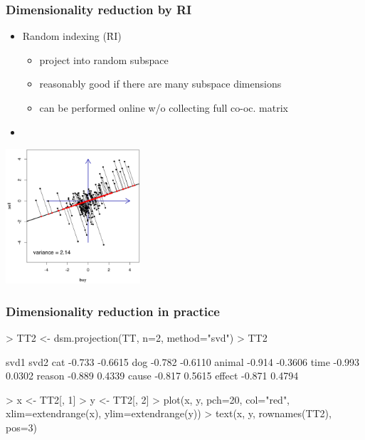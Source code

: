 \documentclass[t]{beamer} %
\begin{document}
\begin{frame}
  \frametitle{Dimensionality reduction by RI}

  \begin{itemize}
  \item Random indexing (\h{RI})
    \begin{itemize}
    \item project into random subspace \citep{Sahlgren:Karlgren:05}
    \item reasonably good if there are many subspace dimensions
    \item can be performed online w/o collecting full co-oc. matrix
    \end{itemize}
    \item[]
  \end{itemize}

  \begin{center}
    \includegraphics[width=5cm]{img/buy_sell_3_projection}
  \end{center}
\end{frame}

\begin{frame}[fragile]
  \frametitle{Dimensionality reduction in practice}

\ungap[1.5]
\begin{Rcode}
> TT2 <- dsm.projection(TT, n=2, method="svd")
> TT2\begin{Rout}
         svd1    svd2
cat    -0.733 -0.6615
dog    -0.782 -0.6110
animal -0.914 -0.3606
time   -0.993  0.0302
reason -0.889  0.4339
cause  -0.817  0.5615
effect -0.871  0.4794
\end{Rout}
> x <- TT2[, 1] 
> y <- TT2[, 2] 
> plot(x, y, pch=20, col="red", 
       xlim=extendrange(x), ylim=extendrange(y))
> text(x, y, rownames(TT2), pos=3)    
\end{Rcode}
  
\end{frame}
\end{document}
